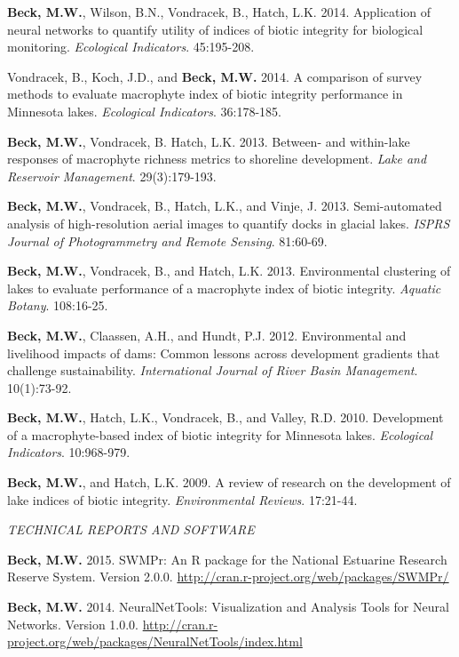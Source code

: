 \documentclass[letterpaper,12pt]{article}
\begin{document}
\textbf{Beck, M.W.}, Wilson, B.N., Vondracek, B., Hatch, L.K. 2014. Application of neural networks to quantify utility of indices of biotic integrity for biological monitoring. \textit{Ecological Indicators}. 45:195-208.

Vondracek, B., Koch, J.D., and \textbf{Beck, M.W.} 2014. A comparison of survey methods to evaluate macrophyte index of biotic integrity performance in Minnesota lakes. \textit{Ecological Indicators}. 36:178-185.

\textbf{Beck, M.W.}, Vondracek, B. Hatch, L.K. 2013. Between- and within-lake responses of macrophyte richness metrics to shoreline development. \textit{Lake and Reservoir Management}. 29(3):179-193.

\textbf{Beck, M.W.}, Vondracek, B., Hatch, L.K., and Vinje, J. 2013. Semi-automated analysis of high-resolution aerial images to quantify docks in glacial lakes. \textit{ISPRS Journal of Photogrammetry and Remote Sensing}. 81:60-69.

\textbf{Beck, M.W.}, Vondracek, B., and Hatch, L.K. 2013. Environmental clustering of lakes to evaluate performance of a macrophyte index of biotic integrity. \textit{Aquatic Botany}. 108:16-25.

\textbf{Beck, M.W.}, Claassen, A.H., and Hundt, P.J. 2012. Environmental and livelihood impacts of dams: Common lessons across development gradients that challenge sustainability. \textit{International Journal of River Basin Management}. 10(1):73-92.

\textbf{Beck, M.W.}, Hatch, L.K., Vondracek, B., and Valley, R.D. 2010. Development of a macrophyte-based index of biotic integrity for Minnesota lakes. \textit{Ecological Indicators}. 10:968-979.

\textbf{Beck, M.W.}, and Hatch, L.K. 2009. A review of research on the development of lake indices of biotic integrity. \textit{Environmental Reviews}. 17:21-44.

\vspace{\baselineskip} 
\centerline{\large{\textit{TECHNICAL REPORTS AND SOFTWARE}}}

\textbf{Beck, M.W.} 2015. SWMPr: An R package for the National Estuarine Research Reserve System. Version 2.0.0. \href{http://cran.r-project.org/web/packages/SWMPr/}{http://cran.r-project.org/web/packages/SWMPr/}

\textbf{Beck, M.W.} 2014. NeuralNetTools: Visualization and Analysis Tools for Neural Networks. Version 1.0.0. \href{http://cran.r-project.org/web/packages/NeuralNetTools/index.html}{http://cran.r-project.org/web/packages/NeuralNetTools/index.html}
\end{document}
